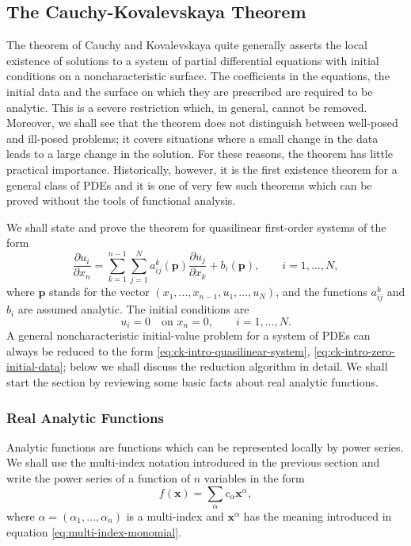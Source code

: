\subsection{The Cauchy-Kovalevskaya Theorem}\label{sec:cauchy-kovalevskaya}

The theorem of Cauchy and Kovalevskaya quite generally asserts the local existence of solutions to a system of partial differential equations with initial conditions on a noncharacteristic surface. The coefficients in the equations, the initial data and the surface on which they are prescribed are required to be analytic. This is a severe restriction which, in general, cannot be removed. Moreover, we shall see that the theorem does not distinguish between well-posed and ill-posed problems; it covers situations where a small change in the data leads to a large change in the solution. For these reasons, the theorem has little practical importance. Historically, however, it is the first existence theorem for a general class of PDEs and it is one of very few such theorems which can be proved without the tools of functional analysis.

We shall state and prove the theorem for quasilinear first-order systems of the form
\begin{equation}\label{eq:ck-intro-quasilinear-system}
\dfrac{\partial u_i}{\partial x_n}=\sum_{k=1}^{n-1}\sum_{j=1}^Na_{ij}^k(\bm{p})\dfrac{\partial u_j}{\partial x_k}+b_i(\bm{p}),\qquad i=1,\ldots,N,
\end{equation}
where $\bm{p}$ stands for the vector $(x_1,\ldots,x_{n-1},u_1,\ldots,u_N)$, and the functions $a_{ij}^k$ and $b_i$ are assumed analytic. The initial conditions are
\begin{equation}\label{eq:ck-intro-zero-initial-data}
u_i=0\quad\text{on }x_n=0,\qquad i=1,\ldots,N.
\end{equation}
A general noncharacteristic initial-value problem for a system of PDEs can always be reduced to the form \eqref{eq:ck-intro-quasilinear-system}, \eqref{eq:ck-intro-zero-initial-data}; below we shall discuss the reduction algorithm in detail. We shall start the section by reviewing some basic facts about real analytic functions.

\subsubsection{Real Analytic Functions}\label{subsec:real-analytic-functions}

Analytic functions are functions which can be represented locally by power series. We shall use the multi-index notation introduced in the previous section and write the power series of a function of $n$ variables in the form
\begin{equation}\label{eq:multivariable-power-series}
f(\bm{x})=\sum_\alpha c_\alpha\bm{x}^{\alpha},
\end{equation}
where $\alpha=(\alpha_1,\ldots,\alpha_n)$ is a multi-index and $\bm{x}^{\alpha}$ has the meaning introduced in equation \eqref{eq:multi-index-monomial}.

